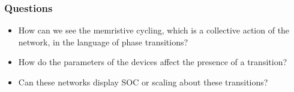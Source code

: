 \documentclass[mathserif]{beamer}
\begin{document}
\begin{frame}
\begin{columns}
\end{columns}

\end{frame}

\begin{frame}
\frametitle{Questions}
\begin{itemize}
\item<1> How can we see the memristive cycling, which is a collective action of the network,
in the language of phase transitions?
\item<2> How do the parameters of the devices affect the presence of a transition?
\item<3> Can these networks display SOC or scaling about these transitions?
\end{itemize}
\end{frame}
\end{document}
